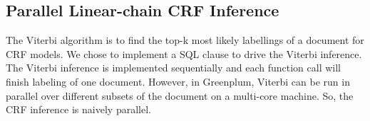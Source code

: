 \documentclass[11pt,letterpaper]{article}
\begin{document}



\subsection{Parallel Linear-chain CRF Inference}
 The Viterbi algorithm is to find the top-k most likely labellings of a document 
for CRF models. 
We chose to implement a SQL clause to drive the Viterbi inference. 
The Viterbi inference is implemented sequentially and each function call 
will finish labeling of one document.
However, in Greenplum, Viterbi can be run in parallel over different subsets 
of the document on a multi-core machine. So, the CRF inference is naively parallel. 



\end{document}
